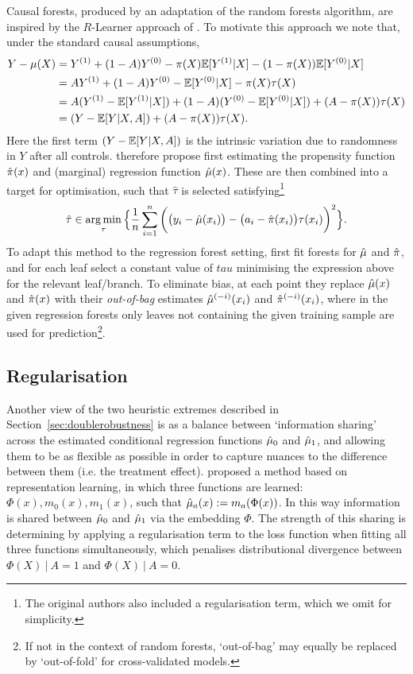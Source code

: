 \documentclass[../thesis.tex]{subfiles}
\begin{document}
Causal forests, produced by an adaptation of the random forests algorithm, are inspired by the $R$-Learner approach of \citet{nie_learning_2017}. To motivate this approach we note that, under the standard causal assumptions,
\begin{align*} 
Y - \mu(X) & = Y^{(1)} + (1-A)Y^{(0)} - \pi(X)\mathbb{E}[Y^{(1)}|X] - (1-\pi(X))\mathbb{E}[Y^{(0)}|X]
\\  
& = AY^{(1)} + (1-A)Y^{(0)}- \mathbb{E}[Y^{(0)}|X] - \pi(X)\tau(X) \\
& = A(Y^{(1)} - \mathbb{E}[Y^{(1)}|X]) + (1-A)(Y^{(0)}- \mathbb{E}[Y^{(0)}|X]) + (A-\pi(X))\tau(X) \\
& = (Y - \mathbb{E}[Y|X,A]) + (A-\pi(X))\tau(X).
\end{align*}
Here the first term $(Y-\mathbb{E}[Y|X,A])$ is the intrinsic variation due to randomness in $Y$ after all controls. \citet{nie_learning_2017} therefore propose first estimating the propensity function $\hat{\pi}(x)$ and (marginal) regression function $\hat{\mu}(x)$. These are then combined into a target for optimisation, such that $\hat{\tau}$ is selected satisfying\footnote{The original authors also included a regularisation term, which we omit for simplicity.} 
\[\hat{\tau} \in \operatorname*{arg\,min}_{\tau} \Big\{\frac{1}{n}\sum_{i=1}^{n} \bigg( \big(y_i - \hat{\mu}(x_i)\big) - \big(a_i - \hat{\pi}(x_i)\big)\tau(x_i)\bigg)^2  \Big\}.\]
To adapt this method to the regression forest setting, \citet{athey_generalized_2019} first fit forests for $\hat{\mu}$ and $\hat{\pi}$, and for each leaf select a constant value of $tau$ minimising the expression above for the relevant leaf/branch. To eliminate bias, at each point they replace $\hat{\mu}(x)$ and $\hat{\pi}(x)$ with their \emph{out-of-bag} estimates $\hat{\mu}^{(-i)}(x_i)$ and $\hat{\pi}^{(-i)}(x_i)$, where in the given regression forests only leaves not containing the given training sample are used for prediction\footnote{If not in the context of random forests, `out-of-bag' may equally be replaced by `out-of-fold' for cross-validated models.}.


\subsection{Regularisation} \label{sec:regularisation_hte}
Another view of the two heuristic extremes described in Section~\ref{sec:doublerobustness} is as a balance between  `information sharing' across the estimated conditional regression functions $\hat{\mu}_0$ and $\hat{\mu}_1$, and allowing them to be as flexible as possible in order to capture nuances to the difference between them (i.e. the treatment effect). \citet{shalit_estimating_2017} proposed a method based on representation learning, in which three functions are learned: $\Phi(x), m_0(x), m_1(x)$, such that $\hat{\mu}_a(x) := m_a(\Phi(x))$. In this way information is shared between $\hat{\mu}_0$ and $\hat{\mu}_1$ via the embedding $\Phi$. The strength of this sharing is determining by applying a regularisation term to the loss function when fitting all three functions simultaneously, which penalises distributional divergence between $\Phi(X) \ | \ A = 1$ and $\Phi(X)  \ | \ A = 0$. 
\end{document}
